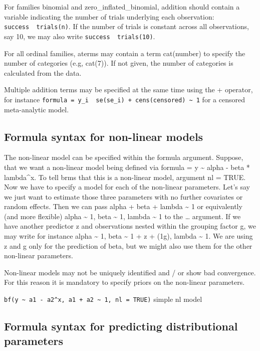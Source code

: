 \documentclass[]{book}
\begin{document}
For families binomial and zero\_inflated\_binomial, addition should
contain a variable indicating the number of trials underlying each
observation: \texttt{success\ \textbar{}\ trials(n)}. If the number of
trials is constant across all observations, say 10, we may also write
\texttt{success\ \textbar{}\ trials(10)}.

For all ordinal families, aterms may contain a term cat(number) to
specify the number of categories (e.g, cat(7)). If not given, the number
of categories is calculated from the data.

Multiple addition terms may be specified at the same time using the +
operator, for instance
\texttt{formula\ =\ y\_i\ \textbar{}\ se(se\_i)\ +\ cens(censored)\ \textasciitilde{}\ 1}
for a censored meta-analytic model.

\subsection{Formula syntax for non-linear
models}\label{formula-syntax-for-non-linear-models}

The non-linear model can be specified within the formula argument.
Suppose, that we want a non-linear model being defined via formula = y
\textasciitilde{} alpha - beta * lambda\^{}x. To tell brms that this is
a non-linear model, argument nl = TRUE. Now we have to specify a model
for each of the non-linear parameters. Let's say we just want to
estimate those three parameters with no further covariates or random
effects. Then we can pass alpha + beta + lambda \textasciitilde{} 1 or
equivalently (and more flexible) alpha \textasciitilde{} 1, beta
\textasciitilde{} 1, lambda \textasciitilde{} 1 to the \ldots{}
argument. If we have another predictor z and observations nested within
the grouping factor g, we may write for instance alpha \textasciitilde{}
1, beta \textasciitilde{} 1 + z + (1\textbar{}g), lambda
\textasciitilde{} 1. We are using z and g only for the prediction of
beta, but we might also use them for the other non-linear parameters.

Non-linear models may not be uniquely identified and / or show bad
convergence. For this reason it is mandatory to specify priors on the
non-linear parameters.

\texttt{bf(y\ \textasciitilde{}\ a1\ -\ a2\^{}x,\ a1\ +\ a2\ \textasciitilde{}\ 1,\ nl\ =\ TRUE)}
simple nl model

\subsection{Formula syntax for predicting distributional
parameters}\label{formula-syntax-for-predicting-distributional-parameters}
\end{document}
